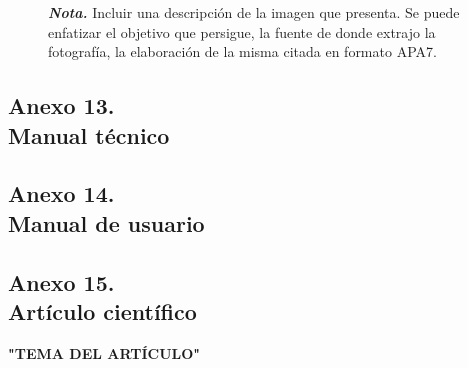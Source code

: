 \documentclass[12pt, a4paper, nofontenc, numbers=endperiod]{apa7}
\begin{document}
{\begin{figure}[h]
	\begin{tablenotes}
		{\small
			\textit{\textbf{Nota.}} Incluir una descripción de la imagen que presenta. Se puede enfatizar el objetivo que persigue, la fuente de donde extrajo la fotografía, la elaboración de la misma citada en formato APA7.
		}
	\end{tablenotes}
\end{figure}


\newpage
\subsection*{\normalsize \centering Anexo 13. \\  Manual técnico}
\newpage
\subsection*{\normalsize \centering Anexo 14. \\ Manual de usuario}
\newpage
\subsection*{\normalsize \centering Anexo 15. \\ Artículo científico}
\begin{center}
	\textbf{"TEMA DEL ARTÍCULO"}
\end{center}

}	
\end{document}
